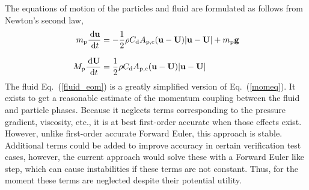 The equations of motion of the particles and fluid are formulated as follows from Newton's second law,
\begin{align}
    \label{particle_eom}
    m_{\rm p} \frac{\,\mathrm{d} \mathbf{u}}{\,\mathrm{d} t} &= - \frac{1}{2} \rho C_\text{d} A_\text{p,c} (\mathbf{u} - \mathbf{U}) |\mathbf{u} - \mathbf{U}| + m_{\rm p} \mathbf{g} \\[.1in]
    \label{fluid_eom}
    M_{\rm p} \frac{\,\mathrm{d} \mathbf{U}}{\,\mathrm{d} t} &= \frac{1}{2} \rho C_\text{d} A_\text{p,c} (\mathbf{u} - \mathbf{U}) |\mathbf{u} - \mathbf{U}|
\end{align}
The fluid Eq.\ (\ref{fluid_eom}) is a greatly simplified version of Eq.\ (\ref{momeq}). It exists to get a reasonable estimate of the momentum coupling between the fluid and particle phases. Because it neglects terms corresponding to the pressure gradient, viscosity, etc., it is at best first-order accurate when those effects exist. However, unlike first-order accurate Forward Euler, this approach is stable. Additional terms could be added to improve accuracy in certain verification test cases, however, the current approach would solve these with a Forward Euler like step, which can cause instabilities if these terms are not constant. Thus, for the moment these terms are neglected despite their potential utility.

